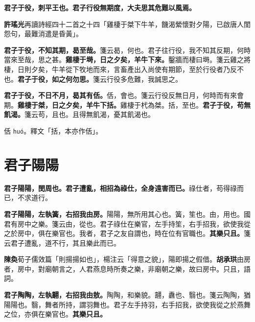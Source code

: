 
\textbf{君子于役，刺平王也。君子行役無期度，大夫思其危難以風焉。}

\begin{quoting}\textbf{許瑤光}再讀詩經四十二首之十四「雞棲于桀下牛羊，饑渴縈懷對夕陽，已啟唐人閨怨句，最難消遣是昏黃」。\end{quoting}

\textbf{君子于役，不知其期，曷至哉。}{\footnotesize 箋云曷，何也。君子往行役，我不知其反期，何時當來至哉，思之甚。}\textbf{雞棲于塒，日之夕矣，羊牛下來。}{\footnotesize 鑿牆而棲曰塒。箋云雞之將棲，日則夕矣，牛羊從下牧地而來，言畜產出入尚使有期節，至於行役者乃反不也。}\textbf{君子于役，如之何勿思。}{\footnotesize 箋云行役多危難，我誠思之。}

\textbf{君子于役，不日不月，曷其有佸。}{\footnotesize 佸，會也。箋云行役反無日月，何時而有來會期。}\textbf{雞棲于桀，日之夕矣，羊牛下括。}{\footnotesize 雞棲于杙為桀。括，至也。}\textbf{君子于役，苟無飢渴。}{\footnotesize 箋云苟，且也。且得無飢渴，憂其飢渴也。}

\begin{quoting}佸 \texttt{huó}。釋文「括，本亦作佸」。\end{quoting}

\section{君子陽陽}


\textbf{君子陽陽，閔周也。君子遭亂，相招為祿仕，全身遠害而已。}{\footnotesize 祿仕者，苟得祿而已，不求道行。}

\textbf{君子陽陽，左執簧，右招我由房。}{\footnotesize 陽陽，無所用其心也。簧，笙也。由，用也。國君有房中之樂。箋云由，從也。君子祿仕在樂官，左手持笙，右手招我，欲使我從之於房中，俱在樂官也。我者，君子之友自謂也，時在位有官職也。}\textbf{其樂只且。}{\footnotesize 箋云君子遭亂，道不行，其且樂此而已。}

\begin{quoting}\textbf{陳奐}荀子儒效篇「則揚揚如也」，楊注云「得意之貌」，陽即揚之假借。\textbf{胡承珙}由房者，房中，對廟朝言之，人君燕息時所奏之樂，非廟朝之樂，故曰房中。只且，語詞。\end{quoting}

\textbf{君子陶陶，左執翿，右招我由敖。}{\footnotesize 陶陶，和樂貌。翿，纛也、翳也。箋云陶陶，猶陽陽也。翳，舞者所持，謂羽舞也。君子左手持羽，右手招我，欲使我從之於燕舞之位，亦俱在樂官也。}\textbf{其樂只且。}

